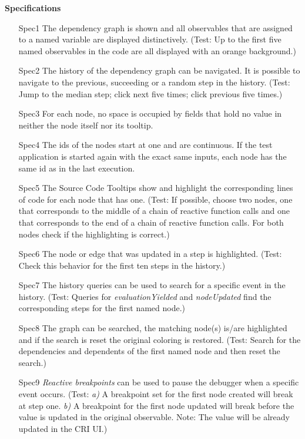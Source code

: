 \textbf{Specifications}
\begin{itemize}
	\item[Spec1] The dependency graph is shown and all observables that are assigned to a named variable are displayed distinctively. (Test: Up to the first five named observables in the code are all displayed with an orange background.)
	\item[Spec2] The history of the dependency graph can be navigated. It is possible to navigate to the previous, succeeding or a random step in the history. (Test: Jump to the median step; click next five times; click previous five times.)
	\item[Spec3] For each node, no space is occupied by fields that hold no value in neither the node itself nor its tooltip.
	\item[Spec4] The ids of the nodes start at one and are continuous. If the test application is started again with the exact same inputs, each node has the same id as in the last execution.
	\item[Spec5] The Source Code Tooltips show and highlight the corresponding lines of code for each node that has one. (Test: If possible, choose two nodes, one that corresponds to the middle of a chain of reactive function calls and one that corresponds to the end of a chain of reactive function calls. For both nodes check if the highlighting is correct.)
	\item[Spec6] The node or edge that was updated in a step is highlighted. (Test: Check this behavior for the first ten steps in the history.)
	\item[Spec7] The history queries can be used to search for a specific event in the history. (Test: Queries for \emph{evaluationYielded} and \emph{nodeUpdated} find the corresponding steps for the first named node.)
	\item[Spec8] The graph can be searched, the matching node(s) is/are highlighted and if the search is reset the original coloring is restored. (Test: Search for the dependencies and dependents of the first named node and then reset the search.)
	\item[Spec9] \emph{Reactive breakpoints} can be used to pause the debugger when a specific event occurs. (Test: \emph{a)} A breakpoint set for the first node created will break at step one. \emph{b)} A breakpoint for the first node updated will break before the value is updated in the original observable. Note: The value will be already updated in the CRI UI.)
\end{itemize}

